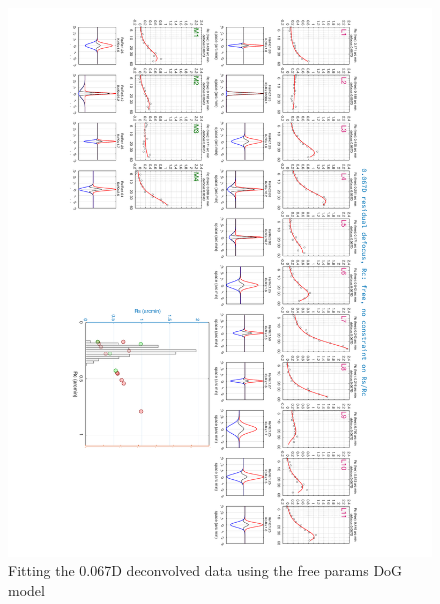 \documentclass[11pt, oneside]{article}   	%
\begin{document}
\begin{figure}[htbp] %
   \centering
   \includegraphics[width=7in]{Slide4.pdf} 
   \caption{Fitting the 0.067D deconvolved  data using the free params DoG model}
   \label{fig:example}
\end{figure}
\end{document}
